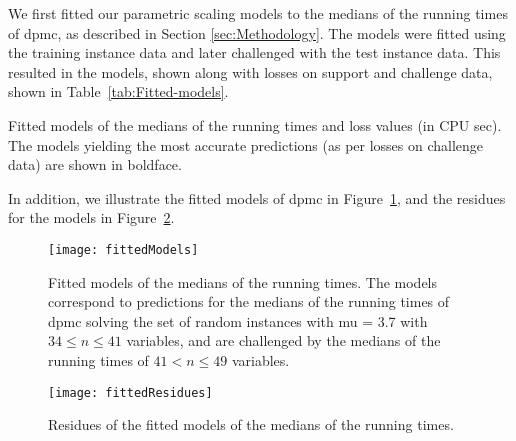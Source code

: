 We first fitted our parametric scaling models to the
medians of the
 running times
of dpmc, as described in Section \ref{sec:Methodology}. The
models were fitted using the training instance data and later
challenged with the test instance data.
This resulted in the models, shown along with losses on support and
challenge data, shown in Table~\ref{tab:Fitted-models}.
\begin{table}[tb]
\begin{centering}

% 
\par\end{centering}

\caption{\label{tab:Fitted-models}Fitted models of the medians
of the  running
times and loss
values (in CPU sec). The models yielding the most
accurate predictions (as per losses on challenge data) are shown in
boldface.}
\end{table}
In addition, we illustrate the fitted models of dpmc in
Figure~\ref{fig:Fitted-models},
and the residues for the models in Figure~\ref{fig:Fitted-residues}.
\begin{figure}[tb]
\noindent \begin{centering}
\texttt{[image: fittedModels]}
\par\end{centering}

\caption{\label{fig:Fitted-models} Fitted models of the medians of the
 running times.
The models correspond to predictions for the medians of the
 running times of
dpmc solving the set of random instances with mu = 3.7
with $34\leq n\leq 41$ variables, and are challenged by the medians of
the 
running times of $41< n \leq 49$ variables.}
\end{figure}


\begin{figure}[tb]
\noindent \begin{centering}
\texttt{[image: fittedResidues]}
\par\end{centering}

\caption{\label{fig:Fitted-residues} Residues of the fitted models of the
medians of the 
running times. }
\end{figure}


